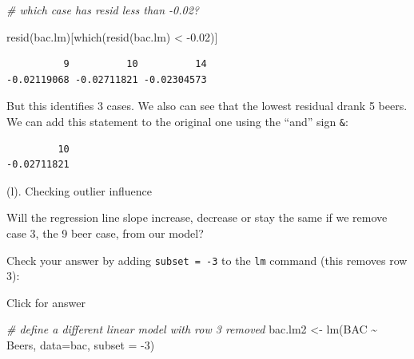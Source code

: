 \documentclass[
]{book}
\newenvironment{Shaded}{\begin{snugshade}}{\end{snugshade}}
\newcommand{\AttributeTok}[1]{\textcolor[rgb]{0.77,0.63,0.00}{#1}}
\newcommand{\CommentTok}[1]{\textcolor[rgb]{0.56,0.35,0.01}{\textit{#1}}}
\newcommand{\DecValTok}[1]{\textcolor[rgb]{0.00,0.00,0.81}{#1}}
\newcommand{\FloatTok}[1]{\textcolor[rgb]{0.00,0.00,0.81}{#1}}
\newcommand{\FunctionTok}[1]{\textcolor[rgb]{0.00,0.00,0.00}{#1}}
\newcommand{\NormalTok}[1]{#1}
\newcommand{\OtherTok}[1]{\textcolor[rgb]{0.56,0.35,0.01}{#1}}
\newcommand{\SpecialCharTok}[1]{\textcolor[rgb]{0.00,0.00,0.00}{#1}}
\begin{document}
\begin{Shaded}
\begin{Highlighting}[]
\CommentTok{\# which case has resid less than {-}0.02?}

\FunctionTok{resid}\NormalTok{(bac.lm)[}\FunctionTok{which}\NormalTok{(}\FunctionTok{resid}\NormalTok{(bac.lm) }\SpecialCharTok{\textless{}} \SpecialCharTok{{-}}\FloatTok{0.02}\NormalTok{)]}
\end{Highlighting}
\end{Shaded}

\begin{verbatim}
          9          10          14 
-0.02119068 -0.02711821 -0.02304573 
\end{verbatim}

But this identifies 3 cases. We also can see that the lowest residual drank 5 beers. We can add this statement to the original one using the ``and'' sign \texttt{\&}:

\begin{Shaded}
\end{Shaded}

\begin{verbatim}
         10 
-0.02711821 
\end{verbatim}

(l). Checking outlier influence

Will the regression line slope increase, decrease or stay the same if we remove case 3, the 9 beer case, from our model?

Check your answer by adding \texttt{subset\ =\ -3} to the \texttt{lm} command (this removes row 3):

Click for answer

\begin{Shaded}
\begin{Highlighting}[]
\CommentTok{\# define a different linear model with row 3 removed }
\NormalTok{bac.lm2 }\OtherTok{\textless{}{-}} \FunctionTok{lm}\NormalTok{(BAC }\SpecialCharTok{\textasciitilde{}}\NormalTok{ Beers, }\AttributeTok{data=}\NormalTok{bac, }\AttributeTok{subset =} \SpecialCharTok{{-}}\DecValTok{3}\NormalTok{)}
\end{Highlighting}
\end{Shaded}
\end{document}
